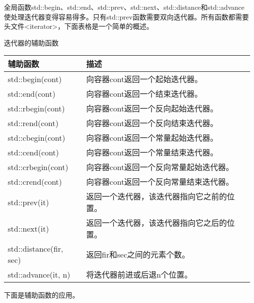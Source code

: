 全局函数std::begin、std::end、std::prev、std::next、std::distance和std::advance使处理迭代器变得容易得多。只有std::prev函数需要双向迭代器。所有函数都需要头文件<iterator>，下面表格是一个简单的概述。

\begin{center}
迭代器的辅助函数
\end{center}

\begin{longtable}[c]{|l|l|}
\hline
\textbf{辅助函数} & \textbf{描述}                                      \\ \hline
\endfirsthead
%
\endhead
%
std::begin(cont)         & 向容器cont返回一个起始迭代器。           \\ \hline
std::end(cont)           & 向容器cont返回一个结束迭代器。            \\ \hline
std::rbegin(cont)        & 向容器cont返回一个反向起始迭代器。   \\ \hline
std::rend(cont)          & 向容器cont返回一个反向结束迭代器。     \\ \hline
std::cbegin(cont)        & 向容器cont返回一个常量起始迭代器。  \\ \hline
std::cend(cont)          & 向容器cont返回一个常量结束迭代器。   \\ \hline
std::crbegin(cont)      & 向容器cont返回一个反向常量起始迭代器。 \\ \hline
std::crend(cont)        & 向容器cont返回一个反向常量结束迭代器。   \\ \hline
std::prev(it)            & 返回一个迭代器，该迭代器指向它之前的位置。 \\ \hline
std::next(it)            & 返回一个迭代器，该迭代器指向它之后的位置。 \\ \hline
std::distance(fir, sec) & 返回fir和sec之间的元素个数。              \\ \hline
std::advance(it, n)      & 将迭代器前进或后退n个位置。                 \\ \hline
\end{longtable}

下面是辅助函数的应用。


